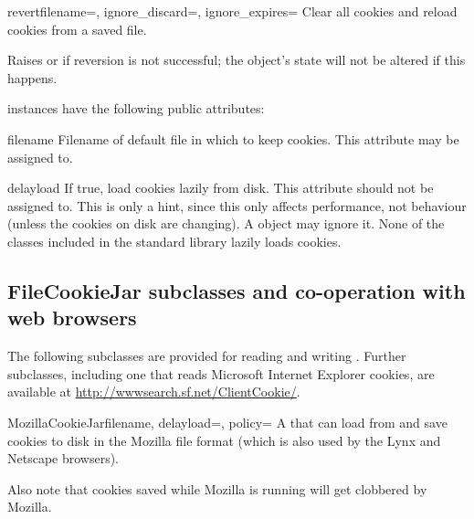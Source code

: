 \begin{methoddesc}[FileCookieJar]{revert}{filename=,
    ignore_discard=, ignore_expires=}
Clear all cookies and reload cookies from a saved file.

Raises  or  if
reversion is not successful; the object's state will not be altered if
this happens.
\end{methoddesc}

 instances have the following public attributes:

\begin{memberdesc}{filename}
Filename of default file in which to keep cookies.  This attribute may
be assigned to.
\end{memberdesc}

\begin{memberdesc}{delayload}
If true, load cookies lazily from disk.  This attribute should not be
assigned to.  This is only a hint, since this only affects
performance, not behaviour (unless the cookies on disk are changing).
A  object may ignore it.  None of the
 classes included in the standard library lazily
loads cookies.
\end{memberdesc}


\subsection{FileCookieJar subclasses and co-operation with web browsers
  \label{file-cookie-jar-classes}}

The following  subclasses are provided for reading
and writing .  Further  subclasses, including one
that reads Microsoft Internet Explorer cookies, are available at
\url{http://wwwsearch.sf.net/ClientCookie/}.

\begin{classdesc}{MozillaCookieJar}{filename, delayload=,
 policy=}
A  that can load from and save cookies to disk in
the Mozilla  file format (which is also used by the
Lynx and Netscape browsers).  


Also note that cookies saved while Mozilla is running will get
clobbered by Mozilla.
\end{classdesc}

